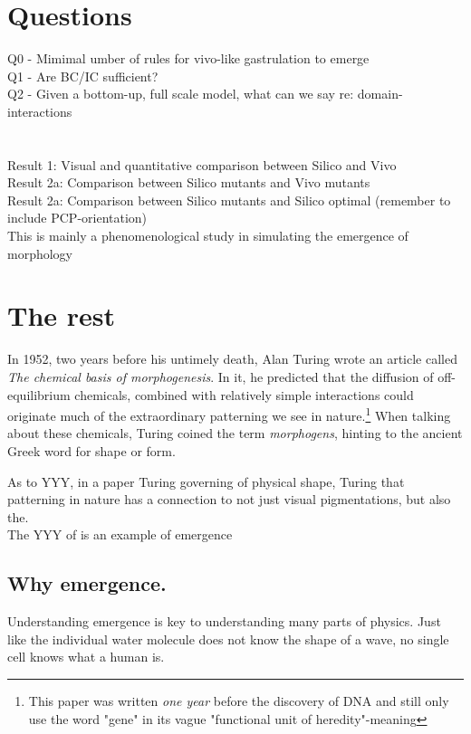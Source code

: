 
\section{Questions}
Q0 - Mimimal umber of rules for vivo-like gastrulation to emerge\\
Q1 - Are BC/IC sufficient?\\
Q2 - Given a bottom-up, full scale model, what can we say re: domain-interactions\\
\\\\
Result 1: Visual and quantitative comparison between Silico and Vivo\\
Result 2a: Comparison between Silico mutants and Vivo mutants\\
Result 2a: Comparison between Silico mutants and Silico optimal (remember to include PCP-orientation)\\

This is mainly a phenomenological study in simulating the emergence of morphology
\section{The rest}
In 1952, two years before his untimely death, Alan Turing wrote an article called
\textit{The chemical basis of morphogenesis}.\cite{turing52the} In it, he predicted that the diffusion of off-equilibrium chemicals, combined with relatively simple interactions could originate much of the extraordinary patterning we see in nature.\footnote{This paper was written \textit{one year} before the discovery of DNA and still only use the word "gene" in its vague "functional unit of heredity"-meaning} When talking about these chemicals, Turing coined the term \textit{morphogens}, hinting to the ancient Greek word for shape or form. 

As to YYY, in a paper Turing governing of physical shape, Turing that patterning in nature has a connection to not just visual pigmentations, but also the. \\


The YYY of is an example of emergence
\subsection{Why emergence. }

Understanding emergence is key to understanding many parts of physics. Just like the individual water molecule does not know the shape of a wave, no single cell knows what a human is. 

